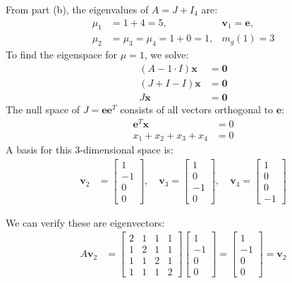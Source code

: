 From part (b), the eigenvalues of $A = J + I_4$ are:
\begin{align*}
    \mu_1 & = 1 + 4 = 5,                 & \mathbf{\mathbf{v}}_1 = \mathbf{e}, \\
    \mu_2 & = \mu_3 = \mu_4 = 1 + 0 = 1, & m_g(1) = 3
\end{align*}
To find the eigenspace for $\mu = 1$, we solve:
\begin{align*}
    \left(A- 1\cdot I\right)\mathbf{x} & = \mathbf{0} \\
    \left(J + I - I\right)\mathbf{x}   & = \mathbf{0} \\
    J\mathbf{x}                        & = \mathbf{0}
\end{align*}
The null space of $J = \mathbf{e}\mathbf{e}^T$ consists of all vectors orthogonal to $\mathbf{e}$:
\begin{align*}
    \mathbf{e}^T\mathbf{x} & = 0 \\
    x_1 + x_2 + x_3 + x_4  & = 0
\end{align*}
A basis for this 3-dimensional space is:
\begin{align*}
    \mathbf{\mathbf{v}}_2 & = \begin{bmatrix} 1 \\ -1 \\ 0 \\ 0 \end{bmatrix}, \quad
    \mathbf{\mathbf{v}}_3 = \begin{bmatrix} 1 \\ 0 \\ -1 \\ 0 \end{bmatrix}, \quad
    \mathbf{\mathbf{v}}_4 = \begin{bmatrix} 1 \\ 0 \\ 0 \\ -1 \end{bmatrix}
\end{align*}

We can verify these are eigenvectors:
\begin{align*}
    A\mathbf{\mathbf{v}}_2 & = \begin{bmatrix} 2 & 1 & 1 & 1 \\ 1 & 2 & 1 & 1 \\ 1 & 1 & 2 & 1 \\ 1 & 1 & 1 & 2 \end{bmatrix} \begin{bmatrix} 1 \\ -1 \\ 0 \\ 0 \end{bmatrix} = \begin{bmatrix} 1 \\ -1 \\ 0 \\ 0 \end{bmatrix} = \mathbf{\mathbf{v}}_2
\end{align*}

